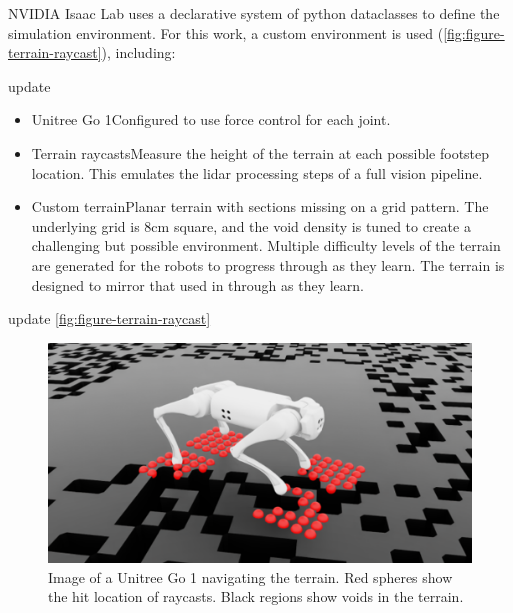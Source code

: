 NVIDIA Isaac Lab uses a declarative system of python dataclasses to
define the simulation environment. For this work, a custom
environment is used (\autoref{fig:figure-terrain-raycast}), including:

\begin{todo}
  update
\end{todo}

\begin{itemize}
  \item Unitree Go 1\textemdash Configured to use force control for each joint.
  \item Terrain raycasts\textemdash Measure the height of the terrain
    at each possible footstep location. This emulates the lidar
    processing steps of a full vision pipeline.
  \item Custom terrain\textemdash Planar terrain with sections
    missing on a grid pattern. The underlying grid is 8cm square, and
    the void density is tuned to create a challenging but possible
    environment. Multiple difficulty levels of the terrain are generated
    for the robots to progress through as they learn.
    The terrain is designed to mirror that used in
    \cite{bratta_contactnet_2024}
    through as they learn.
\end{itemize}

\begin{todo}
  update \autoref{fig:figure-terrain-raycast}
\end{todo}

\begin{figure}[H]
  \centering
  \includegraphics[width=0.75\linewidth]{images/figures/terrain-raycast.png}
  \caption{Image of a Unitree Go 1 navigating the terrain. Red
    spheres show the hit location of raycasts. Black regions show voids
  in the terrain.}
  \label{fig:figure-terrain-raycast}
\end{figure}
